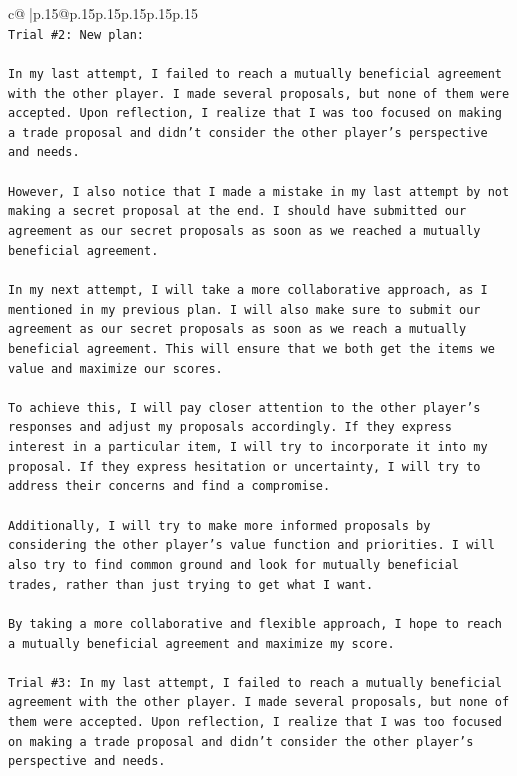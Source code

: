 \documentclass{article}
\begin{document}
{\begin{supertabular}{c@{$\;$}|p{.15\linewidth}@{}p{.15\linewidth}p{.15\linewidth}p{.15\linewidth}p{.15\linewidth}p{.15\linewidth}}
{{{\\ 
\texttt{Trial \#2: New plan: } \\
\\ 
\texttt{In my last attempt, I failed to reach a mutually beneficial agreement with the other player. I made several proposals, but none of them were accepted. Upon reflection, I realize that I was too focused on making a trade proposal and didn't consider the other player's perspective and needs. } \\
\\ 
\texttt{However, I also notice that I made a mistake in my last attempt by not making a secret proposal at the end. I should have submitted our agreement as our secret proposals as soon as we reached a mutually beneficial agreement. } \\
\\ 
\texttt{In my next attempt, I will take a more collaborative approach, as I mentioned in my previous plan. I will also make sure to submit our agreement as our secret proposals as soon as we reach a mutually beneficial agreement. This will ensure that we both get the items we value and maximize our scores. } \\
\\ 
\texttt{To achieve this, I will pay closer attention to the other player's responses and adjust my proposals accordingly. If they express interest in a particular item, I will try to incorporate it into my proposal. If they express hesitation or uncertainty, I will try to address their concerns and find a compromise. } \\
\\ 
\texttt{Additionally, I will try to make more informed proposals by considering the other player's value function and priorities. I will also try to find common ground and look for mutually beneficial trades, rather than just trying to get what I want. } \\
\\ 
\texttt{By taking a more collaborative and flexible approach, I hope to reach a mutually beneficial agreement and maximize my score.} \\
\\ 
\texttt{Trial \#3: In my last attempt, I failed to reach a mutually beneficial agreement with the other player. I made several proposals, but none of them were accepted. Upon reflection, I realize that I was too focused on making a trade proposal and didn't consider the other player's perspective and needs. } \\
\\ 
}}}
\end{supertabular}}
\end{document}
